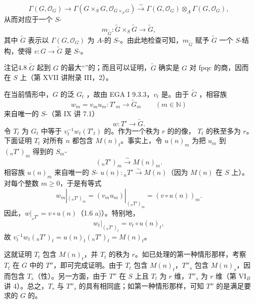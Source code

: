 \[\Gamma(G,\mathcal O_G)\longrightarrow\Gamma(G\times_SG,\mathcal O_{G\times_SG})\xrightarrow{\sim}\Gamma(G,\mathcal O_G)\otimes_A\Gamma(G,\mathcal O_G),\]
从而对应于一个 $S$-
\[m_{\widetilde G}:\widetilde G\times_S\widetilde G\longrightarrow\widetilde G,\]
其中 $\widetilde G$ 表示以 $\Gamma(G,\mathcal O_G)$ 为 $A$-的 $S$-。由此地检查可知，$m_{\widetilde G}$ 赋予 $\widetilde G$ 一个 $S$-结构，使得 $v:G\to\widetilde G$ 是 $S$-。
\begin{SGAresult}{注记}{4.8}
$\widetilde G$ 起到 $G$ 的最大“”的；而且可以证明，$\widetilde G$ 确实是 $G$ 对 fpqc 的商，因而在 $S$ 上（第 XVII 讲附录 III，2）。
\end{SGAresult}
在当前情形中，$G$ 的泛 $G_t$ ，故由 EGA I 9.3.3，$v_t$ 是。由于 $\widetilde G$ ，相容族
\[w_m=v_mu_m:T'_m\longrightarrow\widetilde G_m\qquad(m\in\mathbb N)\]
来自唯一的 $S$-（第 IX 讲 7.1）
\[w:T'\longrightarrow\widetilde G.\]
令 $T_t$ 为 $G_t$ 中等于 $v_t^{-1}w_t(T'_t)$ 的。作为一个秩为 $r$ 的的像， $T_t$ 的秩至多为 $r$。下面证明 $T_t$ 对所有 $n$ 都包含 $M(n)_t$。事实上，令 $u(n)_m$ 为把 $u_m$ 到 $({}_nT')_m$ 得到的 $S_m$-
\[({}_nT')_m\xrightarrow{\sim}M(n)_m.\]
相容族 $u(n)_m$ 来自唯一的 $S$- $u(n):{}_nT'\xrightarrow{\sim}M(n)$（因为 $M(n)$ 在 $S$ 上）。对每个整数 $m\geq0$，于是有等式
\[w_m|_{({}_nT')_m}=(v_mu_m)|_{({}_nT')_m}=(v\circ u(n))_m.\]
因此，$w|_{{}_nT'}=v\circ u(n)$（1.6 a)）。特别地，
\[w_t|_{({}_nT')_t}=v_t\circ u(n)_t,\]
故 $v_t^{-1}w_t({}_nT')_t=u(n)_t({}_nT')_t=M(n)_t$。

这就证明 $T_t$ 包含 $M(n)_t$，并 $T_t$ 的秩为 $r$。如已处理的第一种情形那样，考察 $T_t$ 在 $G$ 中的 $T''$，即可完成证明。由于 $T_t$ 包含 $M(n)_t$，$T''_s$ 包含 $M(n)_s$，因而包含 $T_s$（性）。另一方面，由于 $T''$ 在 $S$ 上且 $T_t$ 为 $r$ 维，$T''_s$ 为 $r$ 维（第 VI$_B$ 讲 4）。总之，$T_s$ 与 $T''_s$ 的具有相同底；如第一种情形那样，可知 $T''$ 的是满足要求的 $G$ 的。

